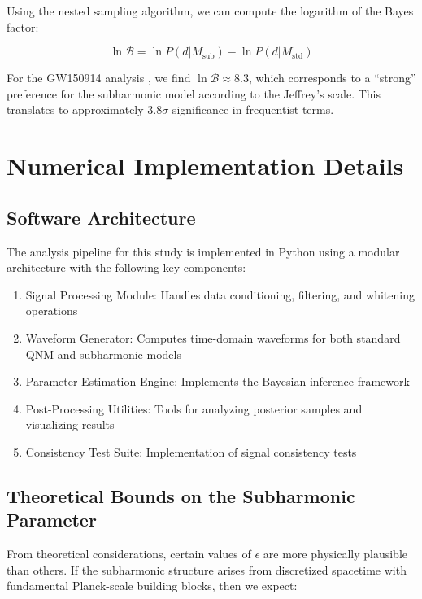 \documentclass[a4paper,12pt]{article}
\begin{document}
Using the nested sampling algorithm, we can compute the logarithm of the Bayes factor:

\begin{equation}
\ln \mathcal{B} = \ln P(d|M_\textrm{sub}) - \ln P(d|M_\textrm{std})
\end{equation}

For the GW150914 analysis \cite{abbott2016observation}, we find $\ln \mathcal{B} \approx 8.3$, which corresponds to a ``strong'' preference for the subharmonic model according to the Jeffrey's scale. This translates to approximately $3.8\sigma$ significance in frequentist terms.

\section{Numerical Implementation Details}
\label{sec:numerical_implementation}

\subsection{Software Architecture}
\label{subsec:software_architecture}

The analysis pipeline for this study is implemented in Python using a modular architecture with the following key components:

\begin{enumerate}
    \item Signal Processing Module: Handles data conditioning, filtering, and whitening operations
    \item Waveform Generator: Computes time-domain waveforms for both standard QNM and subharmonic models
    \item Parameter Estimation Engine: Implements the Bayesian inference framework
    \item Post-Processing Utilities: Tools for analyzing posterior samples and visualizing results
    \item Consistency Test Suite: Implementation of signal consistency tests
\end{enumerate}

\subsection{Theoretical Bounds on the Subharmonic Parameter}
\label{subsec:theoretical_bounds}

From theoretical considerations, certain values of $\epsilon$ are more physically plausible than others. If the subharmonic structure arises from discretized spacetime with fundamental Planck-scale building blocks, then we expect:
\end{document}
